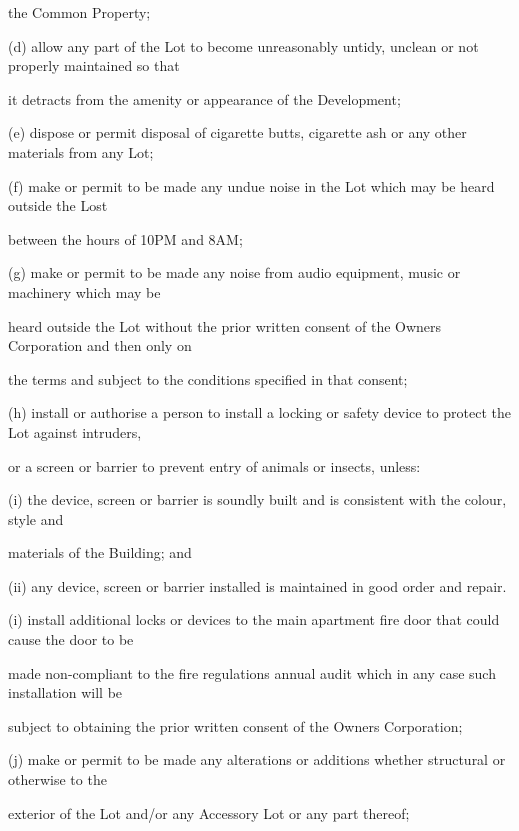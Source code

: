 \documentclass{article}
\begin{document}
{\fontsize{10.02}{1}the Common Property; }

{\fontsize{9.962}{1}(d) allow any part of the Lot to become unreasonably untidy, unclean or not properly maintained so that }

{\fontsize{10.02}{1}it detracts from the amenity or appearance of the Development; }

{\fontsize{9.962}{1}(e) dispose or permit disposal of cigarette butts, cigarette ash or any other materials from any Lot; }

{\fontsize{9.962}{1}(f) make or permit to be made any undue noise in the Lot which may be heard outside the Lost }

{\fontsize{10.02}{1}between the hours of 10PM and 8AM; }

{\fontsize{9.962}{1}(g) make or permit to be made any noise from audio equipment, music or machinery which may be }

{\fontsize{10.02}{1}heard outside the Lot without the prior written consent of the Owners Corporation and then only on }

{\fontsize{10.02}{1}the terms and subject to the conditions specified in that consent; }

{\fontsize{9.962}{1}(h) install or authorise a person to install a locking or safety device to protect the Lot against intruders, }

{\fontsize{10.02}{1}or a screen or barrier to prevent entry of animals or insects, unless: }

{\fontsize{9.962}{1}(i) the device, screen or barrier is soundly built and is consistent with the colour, style and }

{\fontsize{10.02}{1}materials of the Building; and }

{\fontsize{10.02}{1}(ii) any device, screen or barrier installed is maintained in good order and repair. }

{\fontsize{9.962}{1}(i) install additional locks or devices to the main apartment fire door that could cause the door to be }

{\fontsize{10.02}{1}made non-compliant to the fire regulations annual audit which in any case such installation will be }

{\fontsize{10.02}{1}subject to obtaining the prior written consent of the Owners Corporation; }

{\fontsize{9.962}{1}(j) make or permit to be made any alterations or additions whether structural or otherwise to the }

{\fontsize{10.02}{1}exterior of the Lot and/or any Accessory Lot or any part thereof; }
\end{document}
